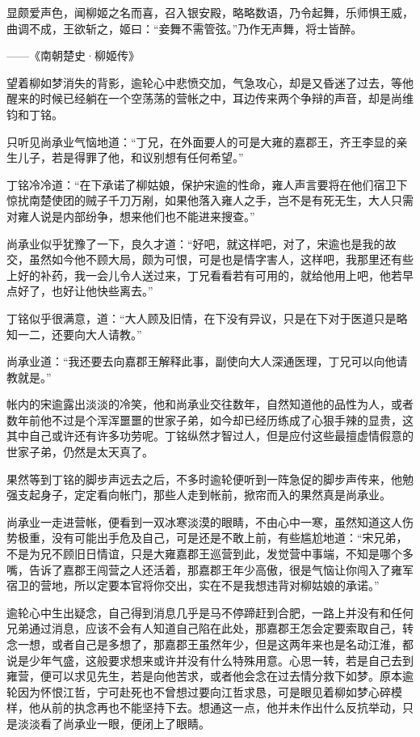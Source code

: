 显颇爱声色，闻柳姬之名而喜，召入银安殿，略略数语，乃令起舞，乐师惧王威，曲调不成，王欲斩之，姬曰：“妾舞不需管弦。”乃作无声舞，将士皆醉。

——《南朝楚史·柳姬传》

望着柳如梦消失的背影，逾轮心中悲愤交加，气急攻心，却是又昏迷了过去，等他醒来的时候已经躺在一个空荡荡的营帐之中，耳边传来两个争辩的声音，却是尚维钧和丁铭。

只听见尚承业气恼地道：“丁兄，在外面要人的可是大雍的嘉郡王，齐王李显的亲生儿子，若是得罪了他，和议别想有任何希望。”

丁铭冷冷道：“在下承诺了柳姑娘，保护宋逾的性命，雍人声言要将在他们宿卫下惊扰南楚使团的贼子千刀万剐，如果他落入雍人之手，岂不是有死无生，大人只需对雍人说是内部纷争，想来他们也不能进来搜查。”

尚承业似乎犹豫了一下，良久才道：“好吧，就这样吧，对了，宋逾也是我的故交，虽然如今他不顾大局，颇为可恨，可是也是情字害人，这样吧，我那里还有些上好的补药，我一会儿令人送过来，丁兄看看若有可用的，就给他用上吧，他若早点好了，也好让他快些离去。”

丁铭似乎很满意，道：“大人顾及旧情，在下没有异议，只是在下对于医道只是略知一二，还要向大人请教。”

尚承业道：“我还要去向嘉郡王解释此事，副使向大人深通医理，丁兄可以向他请教就是。”

帐内的宋逾露出淡淡的冷笑，他和尚承业交往数年，自然知道他的品性为人，或者数年前他不过是个浑浑噩噩的世家子弟，如今却已经历练成了心狠手辣的显贵，这其中自己或许还有许多功劳呢。丁铭纵然才智过人，但是应付这些最擅虚情假意的世家子弟，仍然是太天真了。

果然等到丁铭的脚步声远去之后，不多时逾轮便听到一阵急促的脚步声传来，他勉强支起身子，定定看向帐门，那些人走到帐前，掀帘而入的果然真是尚承业。

尚承业一走进营帐，便看到一双冰寒淡漠的眼睛，不由心中一寒，虽然知道这人伤势极重，没有可能出手危及自己，可是还是不敢上前，有些尴尬地道：“宋兄弟，不是为兄不顾旧日情谊，只是大雍嘉郡王巡营到此，发觉营中事端，不知是哪个多嘴，告诉了嘉郡王闯营之人还活着，那嘉郡王年少高傲，很是气恼让你闯入了雍军宿卫的营地，所以定要本官将你交出，实在不是我想违背对柳姑娘的承诺。”

逾轮心中生出疑念，自己得到消息几乎是马不停蹄赶到合肥，一路上并没有和任何兄弟通过消息，应该不会有人知道自己陷在此处，那嘉郡王怎会定要索取自己，转念一想，或者自己是多想了，那嘉郡王虽然年少，但是这两年来也是名动江淮，都说是少年气盛，这般要求想来或许并没有什么特殊用意。心思一转，若是自己去到雍营，便可以求见先生，若是向他苦求，或者他会念在过去情分救下如梦。原本逾轮因为怀恨江哲，宁可赴死也不曾想过要向江哲求恳，可是眼见着柳如梦心碎模样，他从前的执念再也不能坚持下去。想通这一点，他并未作出什么反抗举动，只是淡淡看了尚承业一眼，便闭上了眼睛。

